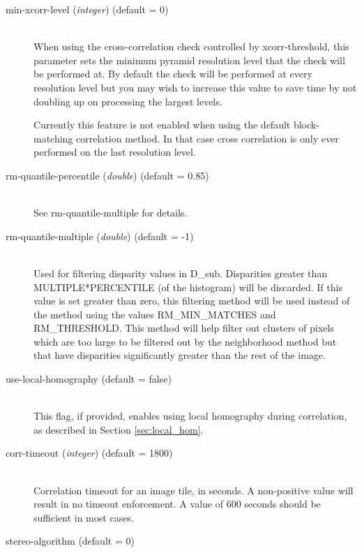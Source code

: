 \begin{description}
\item[min-xcorr-level \textnormal{\small{(\emph{integer})}} (default = 0)] \hfill \\

  When using the cross-correlation check controlled by xcorr-threshold, this parameter
  sets the minimum pyramid resolution level that the check will be performed at.  By 
  default the check will be performed at every resolution level but you may wish to increase
  this value to save time by not doubling up on processing the largest levels.
  
  Currently this feature is not enabled when using the default block-matching correlation
  method.  In that case cross correlation is only ever performed on the last resolution level.


\item[rm-quantile-percentile \textnormal{\small{(\emph{double})}} (default = 0.85)] \hfill \\
  See rm-quantile-multiple for details.

\item[rm-quantile-multiple \textnormal{\small{(\emph{double})}} (default = -1)] \hfill \\
  Used for filtering disparity values in D\_sub.  Disparities 
  greater than MULTIPLE*PERCENTILE (of the histogram) will be discarded.  
  If this value is set greater
  than zero, this filtering method will be used instead of the
  method using the values RM\_MIN\_MATCHES and RM\_THRESHOLD.
  This method will help filter out clusters of pixels which are too large to be
  filtered out by the neighborhood method but that have disparities significantly
  greater than the rest of the image.

\item[use-local-homography \textnormal (default = false)] \hfill \\

  This flag, if provided, enables using local homography during
  correlation, as described in Section \ref{sec:local_hom}.

\item[corr-timeout \textnormal{\small{(\emph{integer})}} (default = 1800)]\hfill \\

  Correlation timeout for an image tile, in seconds. A non-positive
value will result in no timeout enforcement. A value of 600 seconds
should be sufficient in most cases.

\item[stereo-algorithm \textnormal (default = 0)] \hfill \\


\end{description}
